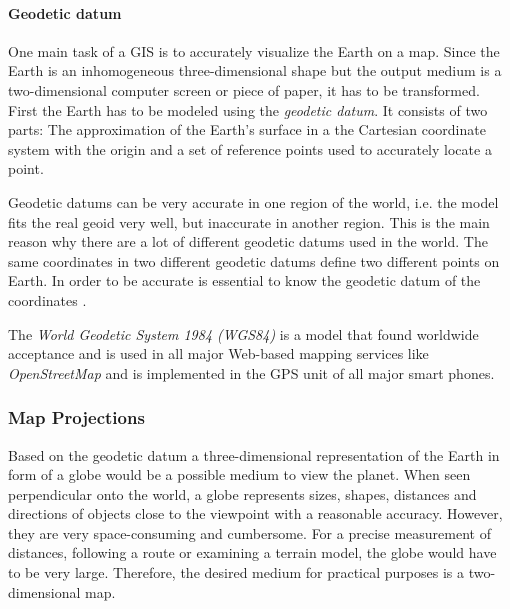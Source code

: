 

\paragraph{Geodetic datum} %
\label{par:geodetic_datum}


One main task of a GIS is to accurately visualize the Earth on a map. Since the Earth is an inhomogeneous three-dimensional shape but the output medium is a two-dimensional computer screen or piece of paper, it has to be transformed. First the Earth has to be modeled using the \emph{geodetic datum}. It consists of two parts: The approximation of the Earth's surface in a the Cartesian coordinate system with the origin and a set of reference points used to accurately locate a point.

Geodetic datums can be very accurate in one region of the world, i.e. the model fits the real geoid very well, but inaccurate in another region. This is the main reason why there are a lot of different geodetic datums used in the world. The same coordinates in two different geodetic datums define two different points on Earth. In order to be accurate is essential to know the geodetic datum of the coordinates
\cite[p. 80]{bolstad2008gis}.

The \emph{World Geodetic System 1984 (WGS84)} is a model that found worldwide acceptance and is used in all major Web-based mapping services like \emph{OpenStreetMap} and is implemented in the GPS unit of all major smart phones.




\subsubsection{Map Projections} %
\label{ssub:map_projections}

Based on the geodetic datum a three-dimensional representation of the Earth in form of a globe would be a possible medium to view the planet. When seen perpendicular onto the world, a globe represents sizes, shapes, distances and directions of objects close to the viewpoint with a reasonable accuracy. However, they are very space-consuming and cumbersome. For a precise measurement of distances, following a route or examining a terrain model, the globe would have to be very large. Therefore, the desired medium for practical purposes is a two-dimensional map.

